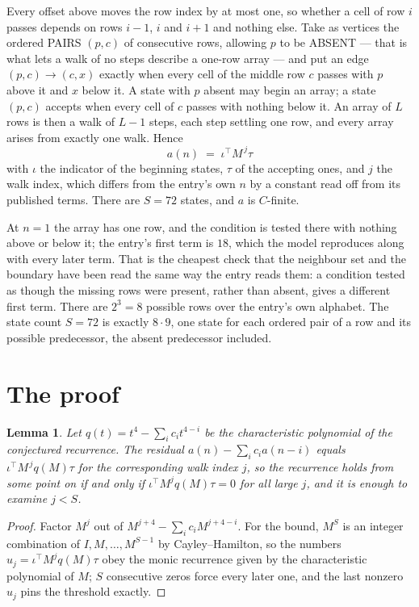 \documentclass[11pt,a4paper]{article}
\theoremstyle{plain}
\newtheorem{lemma}[theorem]{Lemma}
\theoremstyle{definition}
\begin{document}
Every offset above moves the row index by at most one, so whether a cell of row $i$ passes
depends on rows $i-1$, $i$ and $i+1$ and nothing else. Take as vertices the ordered PAIRS
$(p,c)$ of consecutive rows, allowing $p$ to be ABSENT --- that is what lets a walk of no steps
describe a one-row array --- and put an edge $(p,c)\to(c,x)$ exactly when every cell of the
middle row $c$ passes with $p$ above it and $x$ below it. A state with $p$ absent may begin an
array; a state $(p,c)$ accepts when every cell of $c$ passes with nothing below it. An array of
$L$ rows is then a walk of $L-1$ steps, each step settling one row, and every array arises from
exactly one walk. Hence
\[
a(n)\;=\;\iota^{\!\top}M^{\,j}\tau
\]
with $\iota$ the indicator of the beginning states, $\tau$ of the accepting ones, and $j$ the
walk index, which differs from the entry's own $n$ by a constant read off from its published
terms. There are $S=72$ states, and $a$ is $C$-finite.

At $n=1$ the array has one row, and
the condition is tested there with nothing above or below it; the entry's first term is
$18$, which the model reproduces along with every later term. That is the cheapest check
that the neighbour set and the boundary have been read the same way the entry reads them: a
condition tested as though the missing rows were present, rather than absent, gives a different
first term. There are $2^{3}=8$ possible rows over the entry's own alphabet. The state count $S=72$ is exactly $8\cdot9$,
one state for each ordered pair of a row and its possible predecessor, the absent predecessor
included.

\section{The proof}

\begin{lemma}\label{lem:crit}
Let $q(t)=t^{4}-\sum_i c_it^{4-i}$ be the characteristic polynomial of the
conjectured recurrence. The residual $a(n)-\sum_ic_ia(n-i)$ equals
$\iota^{\!\top}M^{\,j}q(M)\tau$ for the corresponding walk index $j$, so the recurrence
holds from some point on if and only if $\iota^{\!\top}M^{j}q(M)\tau=0$ for all large $j$,
and it is enough to examine $j<S$.
\end{lemma}

\begin{proof}
Factor $M^{j}$ out of $M^{j+4}-\sum_ic_iM^{j+4-i}$. For the bound, $M^{S}$
is an integer combination of $I,M,\dots,M^{S-1}$ by Cayley--Hamilton, so the numbers
$u_j=\iota^{\!\top}M^{j}q(M)\tau$ obey the monic recurrence given by the characteristic
polynomial of $M$; $S$ consecutive zeros force every later one, and the last nonzero $u_j$
pins the threshold exactly.
\end{proof}
\end{document}
